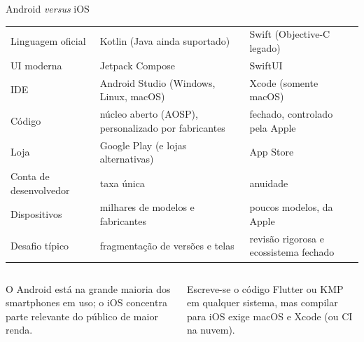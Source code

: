 \documentclass[aspectratio=169,10pt]{beamer}
\begin{document}
\begin{frame}{Android \emph{versus} iOS}
  \scriptsize
  \begin{tabularx}{\textwidth}{@{}l L L@{}}
    \toprule
    &  &  \\
    \midrule
    Linguagem oficial & Kotlin (Java ainda suportado) & Swift (Objective-C legado) \\
    UI moderna & Jetpack Compose & SwiftUI \\
    IDE & Android Studio (Windows, Linux, macOS) & Xcode (somente macOS) \\
    Código & núcleo aberto (AOSP), personalizado por fabricantes & fechado, controlado pela Apple \\
    Loja & Google Play (e lojas alternativas) & App Store \\
    Conta de desenvolvedor & taxa única & anuidade \\
    Dispositivos & milhares de modelos e fabricantes & poucos modelos, da Apple \\
    Desafio típico & fragmentação de versões e telas & revisão rigorosa e ecossistema fechado \\
    \bottomrule
  \end{tabularx}
  \vspace{4pt}
  \begin{columns}[T]
    \begin{column}{0.48\textwidth}
      \begin{conceito}[No Brasil]
        O Android está na grande maioria dos smartphones em uso; o iOS concentra parte relevante do público de maior renda.
      \end{conceito}
    \end{column}
    \begin{column}{0.48\textwidth}
      \begin{dica}
        Escreve-se o código Flutter ou KMP em qualquer sistema, mas compilar para iOS exige macOS e Xcode (ou CI na nuvem).
      \end{dica}
    \end{column}
  \end{columns}
\end{frame}
\end{document}
